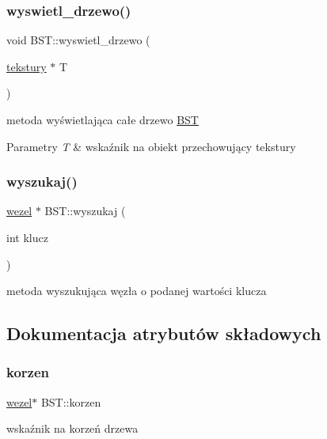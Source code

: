 \subsubsection{\texorpdfstring{wyswietl\+\_\+drzewo()}{wyswietl\_drzewo()}}
{\footnotesize\ttfamily void B\+S\+T\+::wyswietl\+\_\+drzewo (\begin{DoxyParamCaption}\item[{\mbox{\hyperlink{classtekstury}{tekstury}} $\ast$}]{T }\end{DoxyParamCaption})}

metoda wyświetlająca całe drzewo \mbox{\hyperlink{class_b_s_t}{B\+ST}} 
\begin{DoxyParams}{Parametry}
{\em T} & wskaźnik na obiekt przechowujący tekstury \\
\hline
\end{DoxyParams}
\mbox{\label{class_b_s_t_a1b0748887eae594e90cfe2494baa29ea}} 
\subsubsection{\texorpdfstring{wyszukaj()}{wyszukaj()}}
{\footnotesize\ttfamily \mbox{\hyperlink{classwezel}{wezel}} $\ast$ B\+S\+T\+::wyszukaj (\begin{DoxyParamCaption}\item[{int}]{klucz }\end{DoxyParamCaption})}

metoda wyszukująca węzła o podanej wartości klucza 

\subsection{Dokumentacja atrybutów składowych}
\mbox{\label{class_b_s_t_a8b2f27f4b58aceda99b397e3f5447e6a}} 
\subsubsection{\texorpdfstring{korzen}{korzen}}
{\footnotesize\ttfamily \mbox{\hyperlink{classwezel}{wezel}}$\ast$ B\+S\+T\+::korzen}

wskaźnik na korzeń drzewa \mbox{\label{class_b_s_t_a7c4c3ea4245b2eb6e0c87720743c03b4}} 
